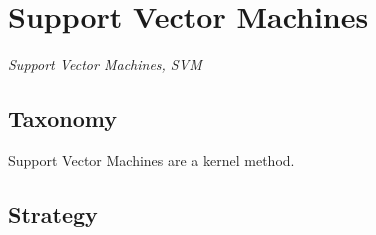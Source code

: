 

\section{Support Vector Machines} 
\label{sec:svm}

\emph{Support Vector Machines, SVM}

\subsection{Taxonomy}
Support Vector Machines are a kernel method.

\subsection{Strategy}

